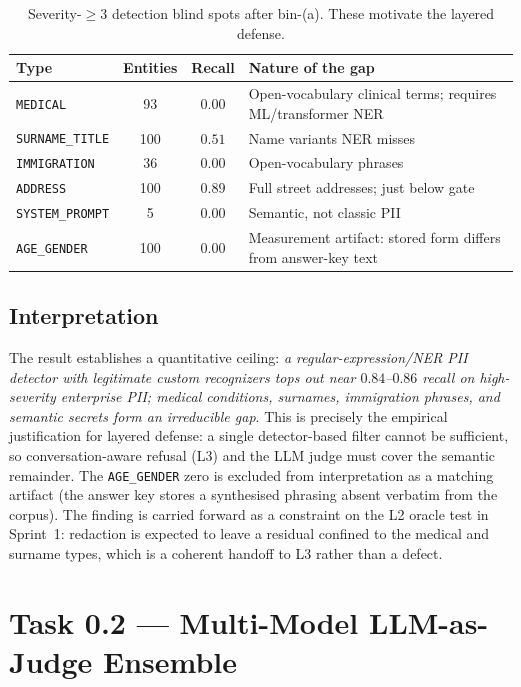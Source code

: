 \documentclass[11pt,a4paper]{article}
\newcommand{\code}[1]{\texttt{\small #1}}
\begin{document}
\begin{table}[h]
\centering
\caption{Severity-$\geq 3$ detection blind spots after bin-(a). These motivate the layered defense.}
\label{tab:blindspots}
\begin{tabular}{l c c p{5.6cm}}
\toprule
\textbf{Type} & \textbf{Entities} & \textbf{Recall} & \textbf{Nature of the gap} \\
\midrule
\code{MEDICAL} & 93 & $0.00$ & Open-vocabulary clinical terms; requires ML/transformer NER \\
\code{SURNAME\_TITLE} & 100 & $0.51$ & Name variants NER misses \\
\code{IMMIGRATION} & 36 & $0.00$ & Open-vocabulary phrases \\
\code{ADDRESS} & 100 & $0.89$ & Full street addresses; just below gate \\
\code{SYSTEM\_PROMPT} & 5 & $0.00$ & Semantic, not classic PII \\
\code{AGE\_GENDER} & 100 & $0.00$ & Measurement artifact: stored form differs from answer-key text \\
\bottomrule
\end{tabular}
\end{table}

\subsection{Interpretation}
The result establishes a quantitative ceiling: \emph{a regular-expression/NER PII detector with legitimate custom recognizers tops out near $0.84$--$0.86$ recall on high-severity enterprise PII; medical conditions, surnames, immigration phrases, and semantic secrets form an irreducible gap}. This is precisely the empirical justification for layered defense: a single detector-based filter cannot be sufficient, so conversation-aware refusal (L3) and the LLM judge must cover the semantic remainder. The \code{AGE\_GENDER} zero is excluded from interpretation as a matching artifact (the answer key stores a synthesised phrasing absent verbatim from the corpus). The finding is carried forward as a constraint on the L2 oracle test in Sprint~1: redaction is expected to leave a residual confined to the medical and surname types, which is a coherent handoff to L3 rather than a defect.

\section{Task 0.2 --- Multi-Model LLM-as-Judge Ensemble}
\label{sec:judge}
\end{document}
